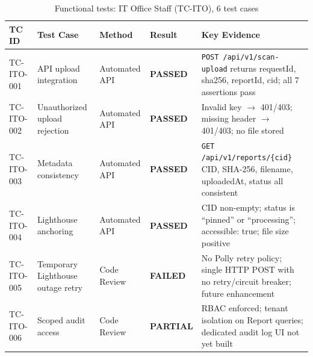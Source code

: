 \begin{table}[H]
  \centering
  \smalltable
  \footnotesize
  {%
  \setlength{\tabcolsep}{4pt}
  \renewcommand{\arraystretch}{1.3}
  \begin{tabular}{|>{\raggedright\arraybackslash}p{}|
                  >{\raggedright\arraybackslash}p{}|
                  >{\raggedright\arraybackslash}p{}|
                  >{\centering\arraybackslash}p{}|
                  >{\raggedright\arraybackslash}p{}|}
    \hline
    \textbf{TC ID} & \textbf{Test Case} & \textbf{Method} & \textbf{Result} & \textbf{Key Evidence} \\
    \hline\hline
    TC-ITO-001 & API upload integration & Automated API & \textbf{PASSED} & \texttt{POST /api/v1/scan-upload} returns requestId, sha256, reportId, cid; all 7 assertions pass \\
    \hline
    TC-ITO-002 & Unauthorized upload rejection & Automated API & \textbf{PASSED} & Invalid key $\rightarrow$ 401/403; missing header $\rightarrow$ 401/403; no file stored \\
    \hline
    TC-ITO-003 & Metadata consistency & Automated API & \textbf{PASSED} & \texttt{GET /api/v1/reports/\{cid\}} CID, SHA-256, filename, uploadedAt, status all consistent \\
    \hline
    TC-ITO-004 & Lighthouse anchoring & Automated API & \textbf{PASSED} & CID non-empty; status is ``pinned'' or ``processing''; accessible: true; file size positive \\
    \hline
    TC-ITO-005 & Temporary Lighthouse outage retry & Code Review & \textbf{FAILED} & No Polly retry policy; single HTTP POST with no retry/circuit breaker; future enhancement \\
    \hline
    TC-ITO-006 & Scoped audit access & Code Review & \textbf{PARTIAL} & RBAC enforced; tenant isolation on Report queries; dedicated audit log UI not yet built \\
    \hline
  \end{tabular}
  }%
  \captionsetup{type=table}
  \caption{Functional tests: IT Office Staff (TC-ITO), 6 test cases}
  \label{tab:func-ito}
\end{table}

